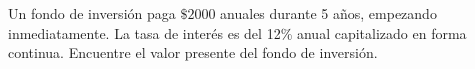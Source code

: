 \item Un fondo de inversión paga $\$2000$ anuales durante 5 años, empezando inmediatamente. La tasa de interés es del 12\% anual capitalizado en forma continua. Encuentre el valor presente del fondo de inversión.
